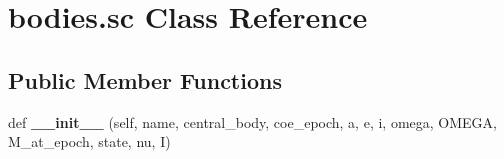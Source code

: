 \hypertarget{classbodies_1_1sc}{}\section{bodies.\+sc Class Reference}
\label{classbodies_1_1sc}
\subsection*{Public Member Functions}
\begin{DoxyCompactItemize}
\item 
\mbox{\label{classbodies_1_1sc_a2a0302d8fbed81fa02f5de64de5b1f0a}} 
def {\bfseries \+\_\+\+\_\+init\+\_\+\+\_\+} (self, name, central\+\_\+body, coe\+\_\+epoch, a, e, i, omega, O\+M\+E\+GA, M\+\_\+at\+\_\+epoch, state, nu, I)
\end{DoxyCompactItemize}
